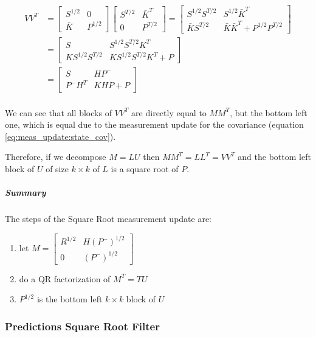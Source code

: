 \documentclass{article}
\begin{document}
\begin{equation}
\begin{split}
    VV^T & = \begin{bmatrix} S^{1/2} & 0 \\ \bar{K} & P^{1/2} \end{bmatrix}\begin{bmatrix} S^{T/2} & \bar{K}^T \\ 0 & P^{T/2} \end{bmatrix} = \begin{bmatrix} S^{1/2}S^{T/2} & S^{1/2}\bar{K}^T \\ \bar{K}S^{T/2} & \bar{K}\bar{K}^T + P^{1/2}P^{T/2} \end{bmatrix}\\
     & = \begin{bmatrix} S & S^{1/2}S^{T/2}K^T \\ KS^{1/2}S^{T/2} & KS^{1/2}S^{T/2}K^T + P\end{bmatrix} \\
     & = \begin{bmatrix} S & HP^- \\ P^-H^T & KHP + P\end{bmatrix} \\
\end{split}
\end{equation}

We can see that all blocks of $VV^T$ are directly equal to $MM^T$, but the bottom left one, which is equal due to the measurement update for the covariance (equation \ref{eq:meas_update:state_cov}).

Therefore, if we decompose $M=LU$ then $MM^T=LL^T=VV^T$ and the bottom left block of $U$ of size $k \times k$ of $L$ is a square root of $P$.

\subparagraph{Summary} The steps of the Square Root measurement update are:
\begin{enumerate}
 \item let $M = \begin{bmatrix} R^{1/2} & H(P^-)^{1/2} \\ 0 & (P^-)^{1/2} \end{bmatrix}$
 \item do a QR factorization of $M^T=TU$
 \item $P^{1/2}$ is the bottom left $k \times k$ block of $U$
\end{enumerate}

\subsubsection{Predictions Square Root Filter}
\end{document}
